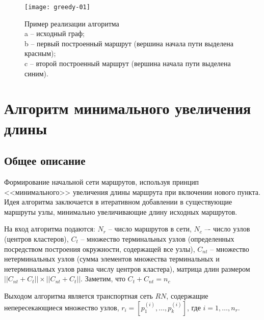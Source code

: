 \begin{figure}[h!]
    \centering
    \texttt{[image: greedy-01]}
    \caption{Пример реализации алгоритма\\
        a -- исходный граф;\\
        b -- первый построенный маршрут (вершина начала пути выделена красным);\\
        c -- второй построенный маршрут (вершина начала пути выделена синим).
    }
   \label{img:greedy-01}
\end{figure}

\section{Алгоритм минимального увеличения длины}
\label{sec:second_alg}
\subsection{Общее описание}
Формирование начальной сети маршрутов, используя принцип <<минимального>> увеличения длины маршрута при 
включении нового пункта. Идея алгоритма заключается в итеративном добавлении в существующие маршруты узлы, 
минимально увеличивающие длину исходных маршрутов. 

На вход алгоритма подаются: \( N_r \) -- число маршрутов в сети, \( N_c \) –- число узлов 
(центров кластеров), \( C_t \) – множество терминальных узлов (определенных посредством построения 
окружности, содержащей все узлы), \( C_{nt} \) -- множество нетерминальных узлов (сумма элементов множества 
терминальных и нетерминальных узлов равна числу центров кластера), матрица длин размером 
\( ||{C_{nt}} + {C_{t}}|| \times ||{C_{nt}} + {C_{t}}|| \). Заметим, что \( C_t + C_{nt} = n_c \)

Выходом алгоритма является транспортная сеть \( RN \), содержащие непересекающиеся множество узлов, 
\( r_{i} = [p_{1}^{(i)}, \dots, p_{k}^{(i)}] \), где \( i = 1, \dots, n_r \). 

